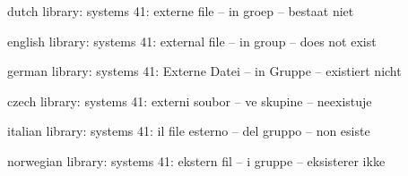 


\unprotect

\startmessages  dutch  library: systems
     41: externe file -- in groep -- bestaat niet
\stopmessages

\startmessages  english  library: systems
     41: external file -- in group -- does not exist
\stopmessages

\startmessages  german  library: systems
     41: Externe Datei -- in Gruppe -- existiert nicht
\stopmessages

\startmessages  czech  library: systems
     41: externi soubor -- ve skupine -- neexistuje
\stopmessages

\startmessages  italian  library: systems
     41: il file esterno -- del gruppo -- non esiste
\stopmessages

\startmessages  norwegian  library: systems
     41: ekstern fil -- i gruppe -- eksisterer ikke
\stopmessages


\setuptabulate
  [\e!legenda]
  [\c!eenheid=.75em,\c!binnen=\setquicktabulate\leg,EQ={=}]



\setuptabulate
  [\e!gegeven]
  [\c!eenheid=.75em,\c!binnen=\setquicktabulate\geg,EQ={=}]

\unexpanded\def\xbox%
  {\bgroup\aftergroup\egroup\hbox\bgroup\tx\let\next=}

\unexpanded\def\xxbox%
  {\bgroup\aftergroup\egroup\hbox\bgroup\txx\let\next=}



